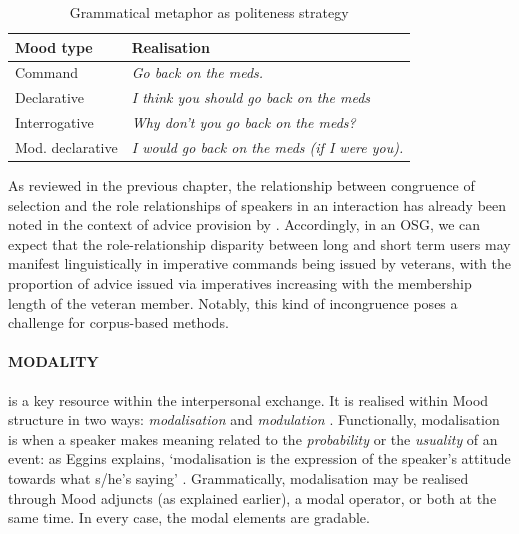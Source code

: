 \begin{table}[htb]
    \begin{tabular}{ll}
    \toprule
    Mood type & Realisation \\
     \midrule
    Command & \emph{Go back on the meds.} \\
    Declarative & \emph{I think you should go back on the meds} \\
    Interrogative &  \emph{Why don't you go back on the meds?} \\
    Mod. declarative & \emph{I would go back on the meds (if I were you).} \\
    \bottomrule
    \end{tabular}
\caption{Grammatical metaphor as politeness strategy}
\label{tab:gram_met_mood}
\end{table}
%
As reviewed in the previous chapter, the relationship between congruence of  selection and the role relationships of speakers in an interaction has already been noted in the context of advice provision by \textcite[see Section \ref{sect:advice}]{decapua_`if_1995}. Accordingly, in an \gls{OSG}, we can expect that the role-relationship disparity between long and short term users may manifest linguistically in imperative commands being issued by veterans, with the proportion of advice issued via imperatives increasing with the membership length of the veteran member. Notably, this kind of incongruence poses a challenge for corpus\hyp{}based methods.


\paragraph{MODALITY} \label{sect:modality}

 is a key resource within the interpersonal exchange. It is realised within Mood structure in two ways: \emph{modalisation} and \emph{modulation} \cite[p.~179]{eggins_introduction_2004}. Functionally, modalisation is when a speaker makes meaning related to the \emph{probability} or the \emph{usuality} of an event: as Eggins explains, `modalisation is the expression of the speaker's attitude towards what s\slash he's saying' \parencite*[p.~180]{eggins_introduction_2004}. Grammatically, modalisation may be realised through Mood adjuncts (as explained earlier), a modal operator, or both at the same time. In every case, the modal elements are gradable. 

